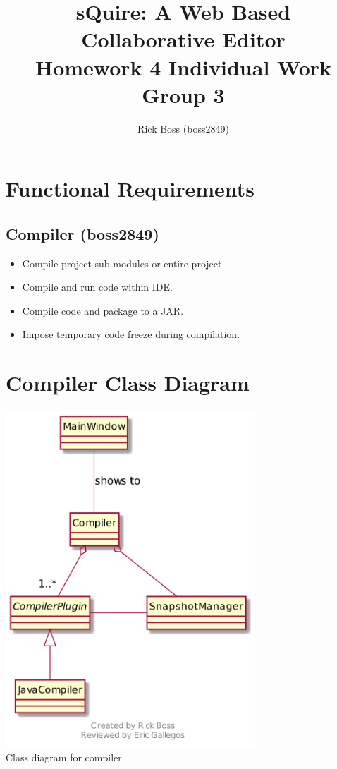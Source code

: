 \documentclass[11pt]{article}
\title{sQuire: A Web Based Collaborative Editor\\Homework 4 Individual Work\\Group 3}
\author{Rick Boss (boss2849)}
\begin{document}
\maketitle

\newpage
\tableofcontents
\newpage

\section{Functional Requirements}
    \subsection{Compiler (boss2849)}
        \begin{itemize}
            \item Compile project sub-modules or entire project.
            \item Compile and run code within IDE.
            \item Compile code and package to a JAR.
            \item Impose temporary code freeze during compilation.
        \end{itemize}

\section{Compiler Class Diagram}
    \begin{minipage}{1\textwidth}
        \begin{center}
            \includegraphics[width=0.7\textwidth]{uml-diagram/class-compiler} \\
            Class diagram for compiler.
        \end{center}
    \end{minipage}
\end{document}
